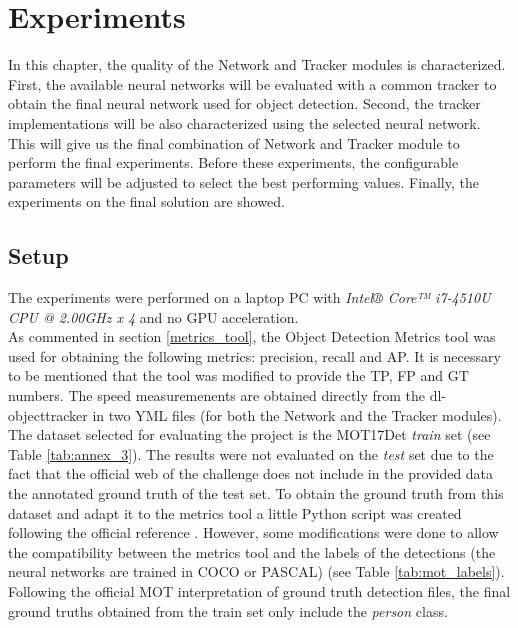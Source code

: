 \chapter{Experiments}
In this chapter, the quality of the Network and Tracker modules is characterized. First, the available neural networks will be evaluated with a common tracker to obtain the final neural network used for object detection. Second, the tracker implementations will be also characterized using the selected neural network. This will give us the final combination of Network and Tracker module to perform the final experiments. Before these experiments, the configurable parameters will be adjusted to select the best performing values. Finally, the experiments on the final solution are showed.\\
\section{Setup}
The experiments were performed on a laptop PC with \textit{Intel® Core™ i7-4510U CPU @ 2.00GHz x 4} and no GPU acceleration.\\ As commented in section \ref{metrics_tool}, the Object Detection Metrics tool was used for obtaining the following metrics: precision, recall and AP. It is necessary to be mentioned that the tool was modified to provide the TP, FP and GT numbers. The speed measuremenents are obtained directly from the dl-objecttracker in two YML files (for both the Network and the Tracker modules).\\
The dataset selected for evaluating the project is the MOT17Det \textit{train} set (see Table \ref{tab:annex_3}). The results were not evaluated on the \textit{test} set due to the fact that the official web of the challenge does not include in the provided data the annotated ground truth of the test set. To obtain the ground truth from this dataset and adapt it to the metrics tool a little Python script was created following the official reference \cite{milan2016mot16}. However, some modifications were done to allow the compatibility between the metrics tool and the labels of the detections (the neural networks are trained in COCO or PASCAL) (see Table \ref{tab:mot_labels}). Following the official MOT interpretation of ground truth detection files, the final ground truths obtained from the train set only include the \textit{person} class.
